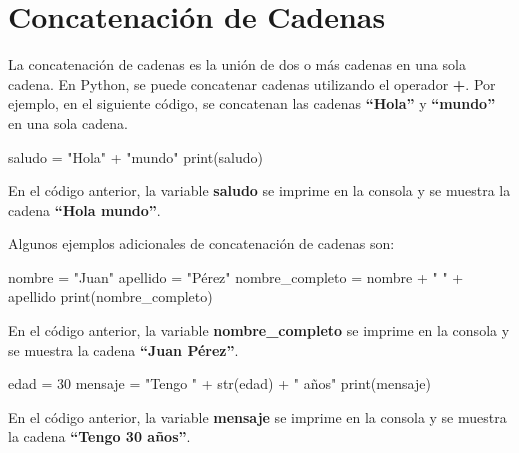 \documentclass[
  a4paper,
  DIV=11,
  numbers=noendperiod,
  onepage,
  openany]{scrreprt}
\newenvironment{Shaded}{\begin{snugshade}}{\end{snugshade}}
\newcommand{\BuiltInTok}[1]{\textcolor[rgb]{0.00,0.23,0.31}{#1}}
\newcommand{\DecValTok}[1]{\textcolor[rgb]{0.68,0.00,0.00}{#1}}
\newcommand{\NormalTok}[1]{\textcolor[rgb]{0.00,0.23,0.31}{#1}}
\newcommand{\OperatorTok}[1]{\textcolor[rgb]{0.37,0.37,0.37}{#1}}
\newcommand{\StringTok}[1]{\textcolor[rgb]{0.13,0.47,0.30}{#1}}
\begin{document}
\section{Concatenación de Cadenas}\label{concatenaciuxf3n-de-cadenas}

La concatenación de cadenas es la unión de dos o más cadenas en una sola
cadena. En Python, se puede concatenar cadenas utilizando el operador
\textbf{+}. Por ejemplo, en el siguiente código, se concatenan las
cadenas \textbf{``Hola''} y \textbf{``mundo''} en una sola cadena.

\begin{Shaded}
\begin{Highlighting}[]
\NormalTok{saludo }\OperatorTok{=} \StringTok{"Hola"} \OperatorTok{+} \StringTok{"mundo"}
\BuiltInTok{print}\NormalTok{(saludo)}
\end{Highlighting}
\end{Shaded}

En el código anterior, la variable \textbf{saludo} se imprime en la
consola y se muestra la cadena \textbf{``Hola mundo''}.

Algunos ejemplos adicionales de concatenación de cadenas son:

\begin{Shaded}
\begin{Highlighting}[]
\NormalTok{nombre }\OperatorTok{=} \StringTok{"Juan"}
\NormalTok{apellido }\OperatorTok{=} \StringTok{"Pérez"}
\NormalTok{nombre\_completo }\OperatorTok{=}\NormalTok{ nombre }\OperatorTok{+} \StringTok{" "} \OperatorTok{+}\NormalTok{ apellido}
\BuiltInTok{print}\NormalTok{(nombre\_completo)}
\end{Highlighting}
\end{Shaded}

En el código anterior, la variable \textbf{nombre\_completo} se imprime
en la consola y se muestra la cadena \textbf{``Juan Pérez''}.

\begin{Shaded}
\begin{Highlighting}[]
\NormalTok{edad }\OperatorTok{=} \DecValTok{30}
\NormalTok{mensaje }\OperatorTok{=} \StringTok{"Tengo "} \OperatorTok{+} \BuiltInTok{str}\NormalTok{(edad) }\OperatorTok{+} \StringTok{" años"}
\BuiltInTok{print}\NormalTok{(mensaje)}
\end{Highlighting}
\end{Shaded}

En el código anterior, la variable \textbf{mensaje} se imprime en la
consola y se muestra la cadena \textbf{``Tengo 30 años''}.
\end{document}
